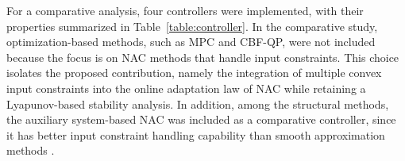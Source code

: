 \documentclass[letterpaper, journal]{IEEEtran}
\begin{document}
\hfill


For a comparative analysis, four controllers were implemented, with their properties summarized in Table~\ref{table:controller}.
In the comparative study, optimization-based methods, such as MPC and CBF-QP, were not included because the focus is on NAC methods that handle input constraints.
This choice isolates the proposed contribution, namely the integration of multiple convex input constraints into the online adaptation law of NAC while retaining a Lyapunov-based stability analysis.
In addition, among the structural methods, the auxiliary system-based NAC was included as a comparative controller, since it has better input constraint handling capability than smooth approximation methods \cite{Min:2021aa}.
\end{document}
